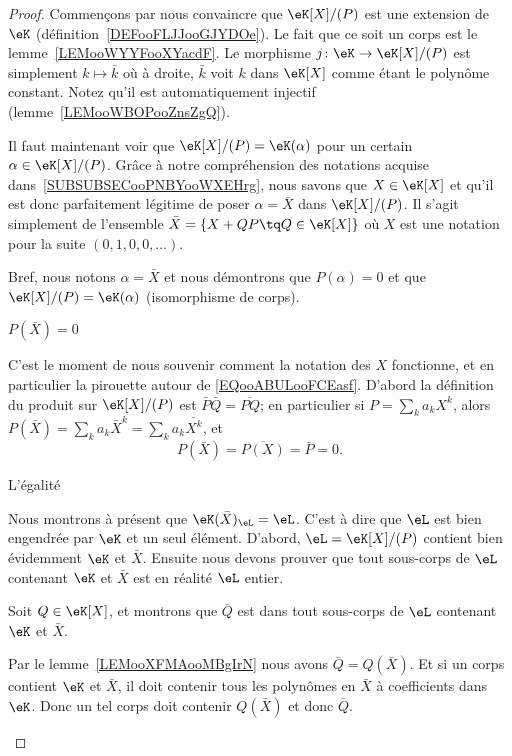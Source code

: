 \begin{proof}
    Commençons par nous convaincre que \( \eK[X]/(P)\) est une extension de \( \eK\) (définition~\ref{DEFooFLJJooGJYDOe}). Le fait que ce soit un corps est le lemme~\ref{LEMooWYYFooXYacdF}. Le morphisme \( j\colon \eK\to \eK[X]/(P)\) est simplement \( k\mapsto \bar k\) où à droite, \( \bar k\) voit \( k\) dans \( \eK[X]\) comme étant le polynôme constant. Notez qu'il est automatiquement injectif (lemme~\ref{LEMooWBOPooZnsZgQ}).

    Il faut maintenant voir que \( \eK[X]/(P)=\eK(\alpha)\) pour un certain \( \alpha\in \eK[X]/(P)\). Grâce à notre compréhension des notations acquise dans~\ref{SUBSUBSECooPNBYooWXEHrg}, nous savons que \( X\in\eK[X]\) et qu'il est donc parfaitement légitime de poser \( \alpha=\bar X\) dans \( \eK[X]/(P)\). Il s'agit simplement de l'ensemble \( \bar X=\{ X+QP\tq Q\in \eK[X] \}\) où \( X\) est une notation pour la suite \( (0,1,0,0,\ldots)\).

    Bref, nous notons \( \alpha=\bar X\) et nous démontrons que \( P(\alpha)=0\) et que \( \eK[X]/(P)=\eK(\alpha)\) (isomorphisme de corps).
    \begin{subproof}
        \item[\( P(\bar X)=0\)]

            C'est le moment de nous souvenir comment la notation des \( X\) fonctionne, et en particulier la pirouette autour de \eqref{EQooABULooFCEasf}. D'abord la définition du produit sur \( \eK[X]/(P)\) est \( \bar P\bar Q=\overline{ PQ }\); en particulier si \( P=\sum_ka_kX^k\), alors \( P(\bar X)=\sum_ka_k\bar X^k=\sum_ka_k\overline{ X^k }\), et
            \begin{equation}
                P(\bar X)=\overline{ P(X) }=\bar P=0.
            \end{equation}
        \item[L'égalité]

            Nous montrons à présent que \( \eK(\bar X)_{\eL}=\eL\). C'est à dire que \( \eL\) est bien engendrée par \( \eK\) et un seul élément. D'abord, \( \eL=\eK[X]/(P)\) contient bien évidemment \( \eK\) et \( \bar X\). Ensuite nous devons prouver que tout sous-corps de \( \eL\) contenant \( \eK\) et \( \bar X\) est en réalité \( \eL\) entier.

            Soit \( Q\in \eK[X]\), et montrons que \( \bar Q\) est dans tout sous-corps de \( \eL\) contenant \( \eK\) et \( \bar X\).

            Par le lemme~\ref{LEMooXFMAooMBgIrN} nous avons \( \bar Q=Q(\bar X)\). Et si un corps contient \( \eK\) et \( \bar X\), il doit contenir tous les polynômes en \( \bar X\) à coefficients dans \( \eK\). Donc un tel corps doit contenir \( Q(\bar X)\) et donc \( \bar Q\).

    \end{subproof}
\end{proof}

